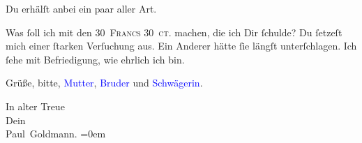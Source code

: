 \pstart
           Du erhälſt anbei ein paar \label{K_L02622-10v}\label{K_L02622-10h}
               aller Art.\pend
           
\pstart
           Was ſoll ich mit den \textsc{30 Francs 30 ct.} machen, die ich Dir
               ſchulde? Du ſetzeſt mich einer ſtarken Verſuchung aus. Ein Anderer hätte ſie längſt
               unterſchlagen. Ich ſehe mit Befriedigung, wie  ehrlich ich bin.\pend
           
\pstart
           Grüße, bitte, \textcolor{blue}{Mutter}{}\ledrightnote{{$\rightarrow$}\textcolor{blue}{Louise Schnitzler}}, \textcolor{blue}{Bruder}{}\ledrightnote{{$\rightarrow$}\textcolor{blue}{Julius Schnitzler}} und \textcolor{blue}{Schwägerin}{}\ledrightnote{{$\rightarrow$}\textcolor{blue}{Helene Schnitzler}}.\pend
           
\pstart
           In alter Treue{\\[\baselineskip]}Dein{\\[\baselineskip]}\spacefill\mbox{Paul Goldmann.}\pend
           \leftskip=0em{}\endnumbering{}  
      